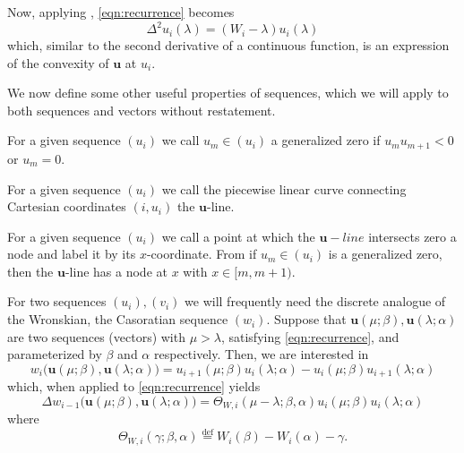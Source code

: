     Now, applying , \cref{eqn:recurrence} becomes
    \begin{equation}\label{eqn:recurrence_difference}
      \Delta^2 u_i(\lambda) = (W_i - \lambda) u_i(\lambda)
    \end{equation}
    which, similar to the second derivative of a continuous function, is an expression of the convexity of $\mathbf{u}$ at $u_i$.

    We now define some other useful properties of sequences, which we will apply to both sequences and vectors without restatement.
    \begin{definition}\label{def:generalized_zero}
      For a given sequence $\left(u_i\right)$ we call $u_m \in \left(u_i\right)$ a generalized zero if $u_m u_{m+1} < 0$ or $u_m = 0$.
    \end{definition}
    \begin{definition}
      For a given sequence $(u_i)$ we call the piecewise linear curve connecting Cartesian coordinates $(i,u_i)$ the $\mathbf{u}$-line.
    \end{definition}
    \begin{definition}\label{def:node}
      For a given sequence $(u_i)$ we call a point at which the $\mathbf{u}-line$ intersects zero a node and label it by its $x$-coordinate. From  if $u_m \in (u_i)$ is a generalized zero, then the $\mathbf{u}$-line has a node at $x$ with $x\in[m,m+1)$.
    \end{definition}

    For two sequences $(u_i),(v_i)$ we will frequently need the discrete analogue of the Wronskian, the Casoratian sequence $(w_i)$. Suppose that $\mathbf{u}(\mu;\beta),\mathbf{u}(\lambda;\alpha)$ are two sequences (vectors) with $\mu > \lambda$, satisfying \cref{eqn:recurrence}, and parameterized by $\beta$ and $\alpha$ respectively. Then, we are interested in
    \begin{equation}
      w_i\big(\mathbf{u}(\mu;\beta),\mathbf{u}(\lambda;\alpha)\big) = u_{i+1}(\mu;\beta)u_i(\lambda;\alpha) - u_i(\mu;\beta)u_{i+1}(\lambda;\alpha)
    \end{equation}
    which, when applied to \cref{eqn:recurrence} yields
    \begin{equation}\label{eqn:Casoratian}
      \Delta w_{i-1}\big(\mathbf{u}(\mu;\beta),\mathbf{u}(\lambda;\alpha)\big) = \Theta_{W,i}(\mu-\lambda;\beta,\alpha) u_{i}(\mu;\beta)u_i(\lambda;\alpha)
    \end{equation}
    where
    \begin{equation}\label{eqn:theta}
      \Theta_{W,i}(\gamma;\beta,\alpha) \stackrel{\text{def}}{=} W_i(\beta) - W_i(\alpha) - \gamma.
    \end{equation}

